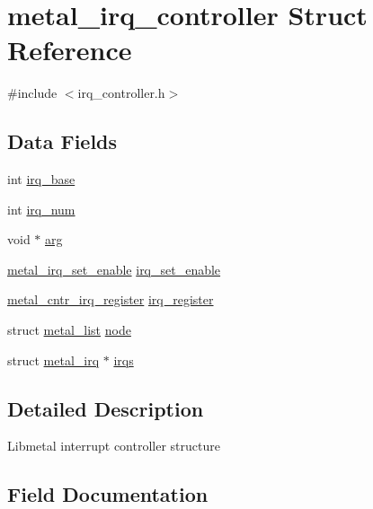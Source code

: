 \hypertarget{structmetal__irq__controller}{}\section{metal\+\_\+irq\+\_\+controller Struct Reference}
\label{structmetal__irq__controller}


{\ttfamily \#include $<$irq\+\_\+controller.\+h$>$}

\subsection*{Data Fields}
\begin{DoxyCompactItemize}
\item 
int \hyperlink{structmetal__irq__controller_af0e813505179ca61b4c26d2017ebb05f}{irq\+\_\+base}
\item 
int \hyperlink{structmetal__irq__controller_ae5a7bded88c88efa511318a901e2c9ed}{irq\+\_\+num}
\item 
void $\ast$ \hyperlink{structmetal__irq__controller_aa682a2fa8c2ea5cc1a6a6655c78fea3c}{arg}
\item 
\hyperlink{group__irq_ga125a768ecd5924b3da91b6ebb6820e9a}{metal\+\_\+irq\+\_\+set\+\_\+enable} \hyperlink{structmetal__irq__controller_a4aead8f0a0116ec6dbdda3c4114d5545}{irq\+\_\+set\+\_\+enable}
\item 
\hyperlink{group__irq_ga22c994407d005793e478ac8267744f88}{metal\+\_\+cntr\+\_\+irq\+\_\+register} \hyperlink{structmetal__irq__controller_a0e3a8f05051213606184fa3efb30e1ff}{irq\+\_\+register}
\item 
struct \hyperlink{structmetal__list}{metal\+\_\+list} \hyperlink{structmetal__irq__controller_a26e87c0da6978319075db2289b901749}{node}
\item 
struct \hyperlink{structmetal__irq}{metal\+\_\+irq} $\ast$ \hyperlink{structmetal__irq__controller_ade636056520b3ad5d7d719d7276a5ead}{irqs}
\end{DoxyCompactItemize}


\subsection{Detailed Description}
Libmetal interrupt controller structure 

\subsection{Field Documentation}
\mbox{\label{structmetal__irq__controller_aa682a2fa8c2ea5cc1a6a6655c78fea3c}} 
